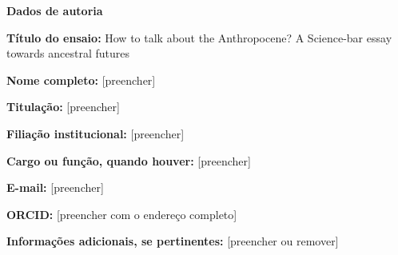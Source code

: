 \documentclass[12pt,a4paper]{article}
\begin{document}
\begin{center}\large\textbf{Dados de autoria}\end{center}

\textbf{Título do ensaio:} How to talk about the Anthropocene?
A Science-bar essay towards ancestral futures

\textbf{Nome completo:} [preencher]

\textbf{Titulação:} [preencher]

\textbf{Filiação institucional:} [preencher]

\textbf{Cargo ou função, quando houver:} [preencher]

\textbf{E-mail:} [preencher]

\textbf{ORCID:} [preencher com o endereço completo]

\textbf{Informações adicionais, se pertinentes:} [preencher ou remover]

\end{document}
